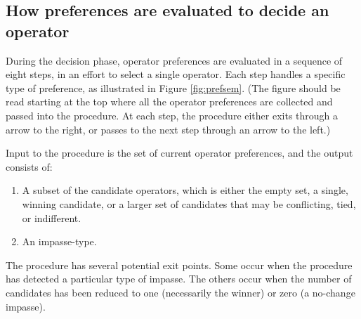 \subsection{How preferences are evaluated to decide an operator}
\label{PREFERENCES}

During the decision phase, operator preferences are evaluated in a sequence of eight steps, in an effort to select a single operator. Each step handles a specific type of preference, as illustrated in Figure \ref{fig:prefsem}. (The figure should be read starting at the top where all the operator preferences are collected and passed into the procedure. At each step, the procedure either exits through a arrow to the right, or passes to the next step through an arrow to the left.)

Input to the procedure is the set of current operator preferences, and the output consists of:

\vspace{-12pt}
\begin{enumerate}
	\item A subset of the candidate operators, which is either the empty set, a single, winning candidate, or a larger set of candidates that may be conflicting, tied, or indifferent.
	\vspace{-6pt}
	\item An impasse-type. %
	\vspace{-6pt}
\end{enumerate}

The procedure has several potential exit points. Some occur when the procedure has detected a particular type of impasse. The others occur when the number of candidates has been reduced to one (necessarily the winner) or zero (a no-change impasse).

